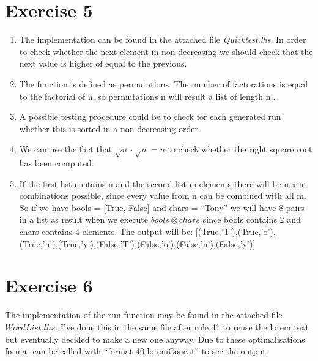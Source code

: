 \documentclass{article}
\begin{document}
\section*{Exercise 5}
\begin{enumerate}
  \item The implementation can be found in the attached file \emph{Quicktest.lhs}. In order to check whether the next element in non-decreasing we should check that the next value is higher of equal to the previous.
  \item The function is defined as permutations. The number of factorations is equal to the factorial of n, so permutations n will result a list of length n!.
  \item A possible testing procedure could be to check for each generated run whether this is sorted in a non-decreasing order.
  \item We can use the fact that $\sqrt{n} \cdot \sqrt{n} = n$ to check whether the right square root has been computed.
  \item If the first list contains n and the second list m elements there will be n x m combinations possible, since every value from n can be combined with all m. So if we have bools = [True, False] and chars = ``Tony'' we will have 8 pairs in a list as result when we execute $bools \otimes chars$ since bools contains 2 and chars contains 4 elements. The output will be:  [(True,'T'),(True,'o'),(True,'n'),(True,'y'),(False,'T'),(False,'o'),(False,'n'),(False,'y')]
\end{enumerate}

\section*{Exercise 6}
The implementation of the run function may be found in the attached file $WordList.lhs$. I've done this in the same file after rule 41 to reuse the lorem text but eventually decided to make a new one anyway. Due to these optimalisations format can be called with ``format 40 loremConcat'' to see the output.
\end{document}
